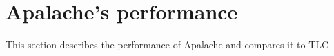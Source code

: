 \section{Apalache's performance}

This section describes the performance of Apalache and compares it to TLC